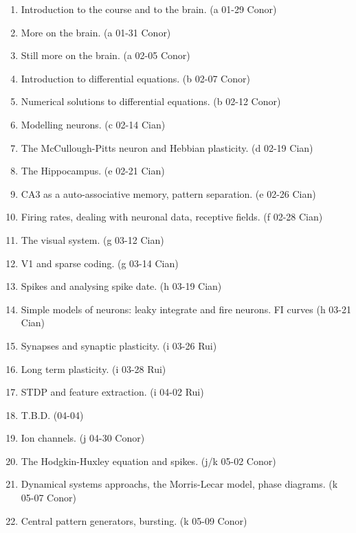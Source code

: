 \documentclass[11pt,a4paper]{scrartcl}
\begin{document}
\begin{enumerate}

\item Introduction to the course and to the brain. (a 01-29 Conor)
\item More on the brain. (a 01-31 Conor)
\item Still more on the brain. (a 02-05 Conor)

\item Introduction to differential equations. (b 02-07 Conor)
\item Numerical solutions to differential equations. (b 02-12 Conor)

\item Modelling neurons. (c 02-14 Cian)
\item The McCullough-Pitts neuron and Hebbian plasticity. (d 02-19 Cian)

\item The Hippocampus. (e 02-21 Cian)
\item CA3 as a auto-associative memory, pattern separation. (e 02-26 Cian)

\item Firing rates, dealing with neuronal data, receptive fields. (f 02-28 Cian)
\newline {}
  
\item The visual system. (g 03-12 Cian)

\item V1 and sparse coding. (g 03-14 Cian)
\item Spikes and analysing spike date. (h 03-19 Cian)

\item Simple models of neurons: leaky integrate and fire neurons. FI curves (h 03-21 Cian)
\item Synapses and synaptic plasticity. (i 03-26 Rui)
\item Long term plasticity. (i 03-28 Rui)
\item STDP and feature extraction. (i 04-02 Rui)
\item T.B.D. (04-04)
\newline {}
  
\item Ion channels. (j 04-30 Conor)
\item The Hodgkin-Huxley equation and spikes. (j/k 05-02 Conor)

\item Dynamical systems approachs, the Morris-Lecar model, phase diagrams. (k 05-07 Conor)
\item Central pattern generators, bursting. (k 05-09 Conor)

\end{enumerate}
\end{document}
